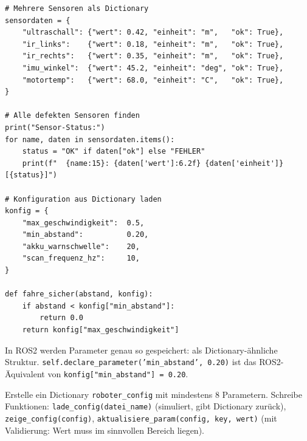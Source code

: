 \begin{lstlisting}
# Mehrere Sensoren als Dictionary
sensordaten = {
    "ultraschall": {"wert": 0.42, "einheit": "m",   "ok": True},
    "ir_links":    {"wert": 0.18, "einheit": "m",   "ok": True},
    "ir_rechts":   {"wert": 0.35, "einheit": "m",   "ok": True},
    "imu_winkel":  {"wert": 45.2, "einheit": "deg", "ok": True},
    "motortemp":   {"wert": 68.0, "einheit": "C",   "ok": True},
}

# Alle defekten Sensoren finden
print("Sensor-Status:")
for name, daten in sensordaten.items():
    status = "OK" if daten["ok"] else "FEHLER"
    print(f"  {name:15}: {daten['wert']:6.2f} {daten['einheit']} [{status}]")

# Konfiguration aus Dictionary laden
konfig = {
    "max_geschwindigkeit":  0.5,
    "min_abstand":          0.20,
    "akku_warnschwelle":    20,
    "scan_frequenz_hz":     10,
}

def fahre_sicher(abstand, konfig):
    if abstand < konfig["min_abstand"]:
        return 0.0
    return konfig["max_geschwindigkeit"]
\end{lstlisting}

\begin{ros}
In ROS2 werden Parameter genau so gespeichert: als Dictionary-ähnliche Struktur. \texttt{self.declare\_parameter('min\_abstand', 0.20)} ist das ROS2-Äquivalent von \texttt{konfig["min\_abstand"] = 0.20}.
\end{ros}

\begin{uebung}[title=Projektaufgabe Modul 6: Roboter-Konfigurationsmanager]
Erstelle ein Dictionary \texttt{roboter\_config} mit mindestens 8 Parametern. Schreibe Funktionen: \texttt{lade\_config(datei\_name)} (simuliert, gibt Dictionary zurück), \texttt{zeige\_config(config)}, \texttt{aktualisiere\_param(config, key, wert)} (mit Validierung: Wert muss im sinnvollen Bereich liegen).
\end{uebung}
